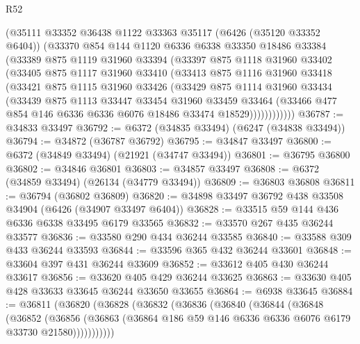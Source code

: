\begin{lexlean}{R52}
\begin{coremodule}
        (@35111
          @33352
          @36438
          @1122
          @33363
          @35117
          (@6426 (@35120 @33352 @6404))
          (@33370
            @854
            @144
            @1120
            @6336
            @6338
            @33350
            @18486
            @33384
            (@33389
              @875
              @1119
              @31960
              @33394
              (@33397
                @875
                @1118
                @31960
                @33402
                (@33405
                  @875
                  @1117
                  @31960
                  @33410
                  (@33413
                    @875
                    @1116
                    @31960
                    @33418
                    (@33421
                      @875
                      @1115
                      @31960
                      @33426
                      (@33429
                        @875
                        @1114
                        @31960
                        @33434
                        (@33439
                          @875
                          @1113
                          @33447
                          @33454
                          @31960
                          @33459
                          @33464
                          (@33466 @477 @854 @146 @6336 @6336 @6076 @18486 @33474 @18529))))))))))))
@36787 := @34833 @33497
@36792 := @6372 (@34835 @33494) (@6247 (@34838 @33494))
@36794 := @34872 (@36787 @36792)
@36795 := @34847 @33497
@36800 := @6372 (@34849 @33494) (@21921 (@34747 @33494))
@36801 := @36795 @36800
@36802 := @34846 @36801
@36803 := @34857 @33497
@36808 := @6372 (@34859 @33494) (@26134 (@34779 @33494))
@36809 := @36803 @36808
@36811 := @36794 (@36802 @36809)
@36820 := @34898 @33497 @36792 @438 @33508 @34904 (@6426 (@34907 @33497 @6404))
@36828 := @33515 @59 @144 @436 @6336 @6338 @33495 @6179 @33565
@36832 := @33570 @267 @435 @36244 @33577
@36836 := @33580 @290 @434 @36244 @33585
@36840 := @33588 @309 @433 @36244 @33593
@36844 := @33596 @365 @432 @36244 @33601
@36848 := @33604 @397 @431 @36244 @33609
@36852 := @33612 @405 @430 @36244 @33617
@36856 := @33620 @405 @429 @36244 @33625
@36863 := @33630 @405 @428 @33633 @33645 @36244 @33650 @33655
@36864 := @6938 @33645
@36884 := @36811
    (@36820
      (@36828
        (@36832
          (@36836
            (@36840
              (@36844
                (@36848
                  (@36852
                    (@36856
                      (@36863 (@36864 @186 @59 @146 @6336 @6336 @6076 @6179 @33730 @21580)))))))))))

\end{coremodule}
\end{lexlean}
